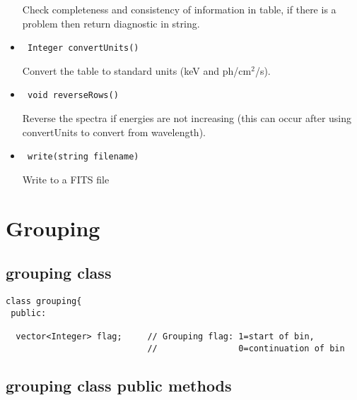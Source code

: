 \documentclass[11pt]{book}
\begin{document}
\begin{itemize}
            Check completeness and consistency of information in table,
            if there is a problem then return diagnostic in string.

\item    \begin{verbatim} Integer convertUnits() \end{verbatim}

            Convert the table to standard units (keV and ph/cm$^2$/s).

\item    \begin{verbatim} void reverseRows() \end{verbatim}

            Reverse the spectra if energies are not increasing (this
            can occur after using convertUnits to convert from wavelength).

\item    \begin{verbatim} write(string filename) \end{verbatim}

            Write to a FITS file

\end{itemize}


\section{Grouping}

\subsection{grouping class}

\begin{verbatim}
class grouping{
 public:

  vector<Integer> flag;     // Grouping flag: 1=start of bin, 
                            //                0=continuation of bin
\end{verbatim}

\subsection{grouping class public methods}
\end{document}
